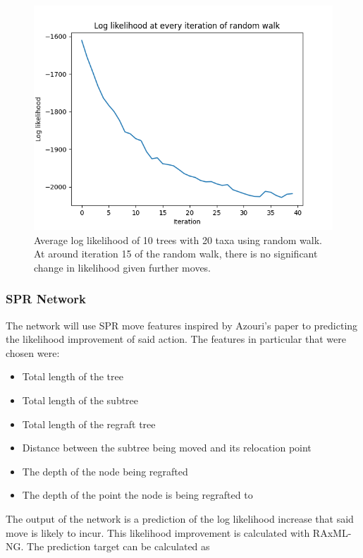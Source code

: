 \documentclass{mpaper}
\begin{document}
\begin{figure}
    \includegraphics[width=1\linewidth]{dissertation/images/iterations_ll.png}
    \centering
    \caption{Average log likelihood of 10 trees with 20 taxa using random walk. At around iteration 15 of the random walk, there is no significant change in likelihood given further moves.}
\end{figure}

\subsubsection{SPR Network}

The network will use SPR move features inspired by Azouri's paper to predicting the likelihood improvement of said action. The features in particular that were chosen were:

\begin{itemize}
    \item Total length of the tree
    \item Total length of the subtree
    \item Total length of the regraft tree
    \item Distance between the subtree being moved and its relocation point
    \item The depth of the node being regrafted
    \item The depth of the point the node is being regrafted to
\end{itemize}

The output of the network is a prediction of the log likelihood increase that said move is likely to incur. This likelihood improvement is calculated with RAxML-NG. The prediction target can be calculated as
\end{document}
